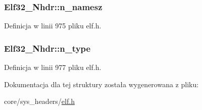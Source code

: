 \hypertarget{struct_elf32___nhdr_a8e6389f882a5c695518a833b4c1bd9c6}{
\subsubsection[{n\-\_\-namesz}]{ Elf32\-\_\-\-Nhdr\-::n\-\_\-namesz}}\label{struct_elf32___nhdr_a8e6389f882a5c695518a833b4c1bd9c6}


Definicja w linii 975 pliku elf.\-h.

\hypertarget{struct_elf32___nhdr_afdab20b47522cb964500a200ceb92462}{
\subsubsection[{n\-\_\-type}]{ Elf32\-\_\-\-Nhdr\-::n\-\_\-type}}\label{struct_elf32___nhdr_afdab20b47522cb964500a200ceb92462}


Definicja w linii 977 pliku elf.\-h.



Dokumentacja dla tej struktury została wygenerowana z pliku\-:\begin{DoxyCompactItemize}
\item 
core/sys\-\_\-headers/\hyperlink{elf_8h}{elf.\-h}\end{DoxyCompactItemize}
